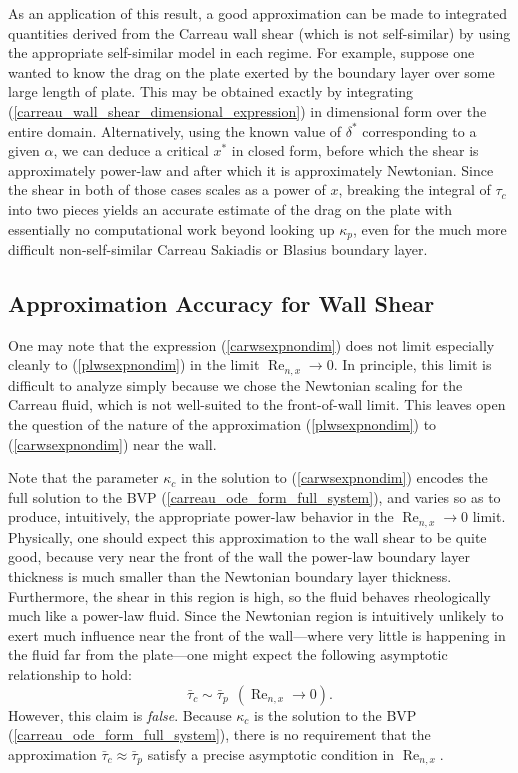 \documentclass{article}
\begin{document}
As an application of this result, a good approximation can be made to integrated quantities derived from the Carreau wall shear (which is not self-similar) by using the appropriate self-similar model in each regime. For example, suppose one wanted to know the drag on the plate exerted by the boundary layer over some large length of plate. This may be obtained exactly by integrating (\ref{carreau_wall_shear_dimensional_expression}) in dimensional form over the entire domain. Alternatively, using the known value of $\delta^*$ corresponding to a given $\alpha$, we can deduce a critical $x^*$ in closed form, before which the shear is approximately power-law and after which it is approximately Newtonian. Since the shear in both of those cases scales as a power of $x$, breaking the integral of $\tau_c$ into two pieces yields an accurate estimate of the drag on the plate with essentially no computational work beyond looking up $\kappa_p$, even for the much more difficult non-self-similar Carreau Sakiadis or Blasius boundary layer.

\subsection{Approximation Accuracy for Wall Shear}

One may note that the expression (\ref{carwsexpnondim}) does not limit especially cleanly to (\ref{plwsexpnondim}) in the limit $\operatorname{Re}_{n, x} \to 0$. In principle, this limit is difficult to analyze simply because we chose the Newtonian scaling for the Carreau fluid, which is not well-suited to the front-of-wall limit. This leaves open the question of the nature of the approximation (\ref{plwsexpnondim}) to (\ref{carwsexpnondim}) near the wall.

Note that the parameter $\kappa_c$ in the solution to (\ref{carwsexpnondim}) encodes the full solution to the BVP (\ref{carreau_ode_form_full_system}), and varies so as to produce, intuitively, the appropriate power-law behavior in the $\operatorname{Re}_{n, x} \to 0$ limit. Physically, one should expect this approximation to the wall shear to be quite good, because very near the front of the wall the power-law boundary layer thickness is much smaller than the Newtonian boundary layer thickness. Furthermore, the shear in this region is high, so the fluid behaves rheologically much like a power-law fluid. Since the Newtonian region is intuitively unlikely to exert much influence near the front of the wall---where very little is happening in the fluid far from the plate---one might expect the following asymptotic relationship to hold:
$$ \bar{\tau}_c \sim \bar{\tau}_p ~~(\operatorname{Re}_{n, x} \to 0).$$
However, this claim is \textit{false}. Because $\kappa_c$ is the solution to the BVP (\ref{carreau_ode_form_full_system}), there is no requirement that the approximation $\bar{\tau}_c \approx \bar{\tau}_p$ satisfy a precise asymptotic condition in $\operatorname{Re}_{n, x}$.
\end{document}
